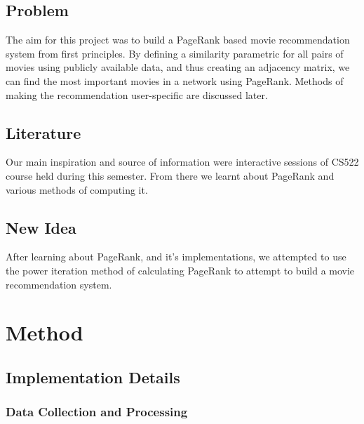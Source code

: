 \documentclass[11pt]{article}
\begin{document}
\hypertarget{problem}{%
\subsection{Problem}\label{problem}}

The aim for this project was to build a PageRank based movie
recommendation system from first principles. By defining a similarity
parametric for all pairs of movies using publicly available data, and
thus creating an adjacency matrix, we can find the most important movies
in a network using PageRank. Methods of making the recommendation
user-specific are discussed later.

\hypertarget{literature}{%
\subsection{Literature}\label{literature}}

Our main inspiration and source of information were interactive sessions
of CS522 course held during this semester. From there we learnt about
PageRank and various methods of computing it.

\hypertarget{new-idea}{%
\subsection{New Idea}\label{new-idea}}

After learning about PageRank, and it's implementations, we attempted to
use the power iteration method of calculating PageRank to attempt to
build a movie recommendation system.

    \hypertarget{method}{%
\section{Method}\label{method}}

\hypertarget{implementation-details}{%
\subsection{Implementation Details}\label{implementation-details}}

\hypertarget{data-collection-and-processing}{%
\subsubsection{Data Collection and
Processing}\label{data-collection-and-processing}}
\end{document}
